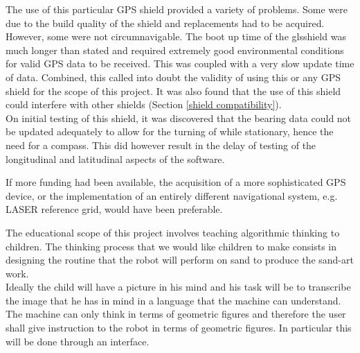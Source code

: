     The use of this particular \gls{GPS} shield provided a variety of problems. Some were due to the build quality of the shield and replacements had to be acquired. However, some were not circumnavigable. The boot up time of the gls{shield} was much longer than stated and required extremely good environmental conditions for valid \gls{GPS} data to be received. This was coupled with a very slow update time of data. Combined, this called into doubt the validity of using this or any \gls{GPS} \gls{shield} for the scope of this project. It was also found that the use of this \gls{shield} could interfere with other \glspl{shield} (Section \ref{shield compatibility}).\\
    On initial testing of this \gls{shield}, it was discovered that the bearing data could not be updated adequately to allow for the turning of \SandE while stationary, hence the need for a compass. This did however result in the delay of testing of the longitudinal and latitudinal aspects of the software.

    If more funding had been available, the acquisition of a more sophisticated \gls{GPS} device, or the implementation of an entirely different navigational system, e.g. LASER reference grid, would have been preferable.


    The educational scope of this project involves teaching algorithmic thinking to children. The thinking process that we would like children to make consists in designing the routine that the robot will perform on sand to produce the sand-art work.\\
    Ideally the child will have a picture in his mind and his task will be to transcribe the image that he has in mind in a language that the machine can understand. The machine can only think in terms of geometric figures and therefore the user shall give instruction to the robot in terms of geometric figures. In particular this will be done through an interface.

